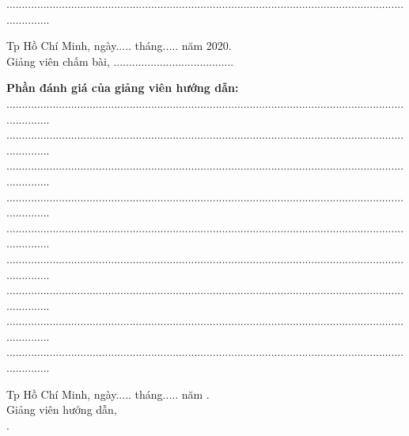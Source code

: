 	...............................................................................................................................................
\begin{center}
	\hspace*{5cm} Tp Hồ Chí Minh, ngày..... tháng..... năm 2020.\\
	\hspace*{5cm} Giảng viên chấm bài,
	\vspace*{1.2cm}
	\hspace*{5cm} .......................................
\end{center}
	\vspace*{0.5cm}
	\textbf{Phần đánh giá của giảng viên hướng dẫn:}\\
	...............................................................................................................................................\\
	...............................................................................................................................................\\
	...............................................................................................................................................\\
	...............................................................................................................................................\\
	...............................................................................................................................................\\
	...............................................................................................................................................\\
	...............................................................................................................................................\\
	...............................................................................................................................................\\
	...............................................................................................................................................
\begin{center}
	\hspace*{5cm} Tp Hồ Chí Minh, ngày..... tháng..... năm \nam.\\
	\hspace*{5cm} Giảng viên hướng dẫn,\\
	\vspace*{2cm}
	\hspace*{5cm} \gvhd.
\newpage
\end{center}